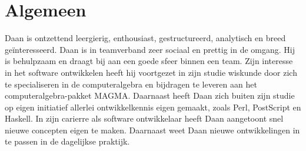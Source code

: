 \section*{Algemeen}

Daan is ontzettend leergierig, enthousiast, gestructureerd, analytisch en breed 
ge\"interesseerd. Daan is in teamverband zeer sociaal en prettig in de omgang. 
Hij is behulpzaam en draagt bij aan een goede sfeer binnen een team. Zijn 
interesse in het software ontwikkelen heeft hij voortgezet in zijn studie 
wiskunde door zich te specialiseren in de computeralgebra en bijdragen te 
leveren aan het computeralgebra-pakket MAGMA. Daarnaast heeft Daan zich buiten 
zijn studie op eigen initiatief allerlei ontwikkelkennis eigen gemaakt, zoals 
Perl, PostScript en Haskell.
In zijn carierre als software ontwikkelaar heeft Daan aangetoont snel nieuwe
concepten eigen te maken. Daarnaast weet Daan nieuwe ontwikkelingen in te 
passen in de dagelijkse praktijk.
